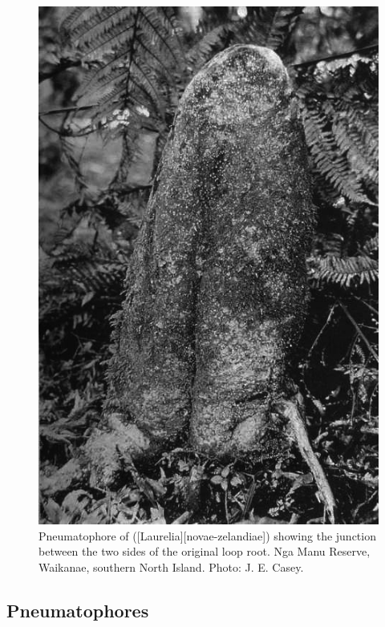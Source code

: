 \begin{figure}[t]
\begin{minipage}[t]{\textwidth}
\begin{minipage}[t]{(\textwidth-\fgap-\fgap) * \real{0.295}}
			\includegraphics[width=\textwidth]{graphics/fig_011}
			\caption[Pneumatophore of pukatea showing the junction between the two sides of the original loop root]{Pneumatophore of  ([Laurelia][novae-zelandiae]) showing the junction between the two sides of the original loop root.
			Nga Manu Reserve, Waikanae, southern North Island.
			Photo:  J. E. Casey.}%
			\label{fig:11pukatea}
		\end{minipage}
	\end{minipage}
\end{figure}

\subsection{Pneumatophores}

